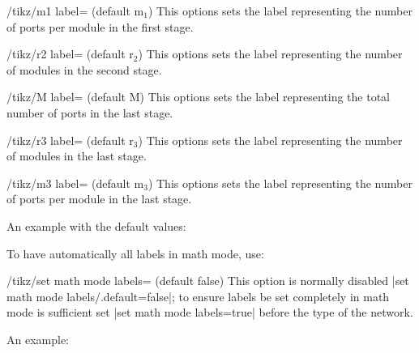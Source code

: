 \documentclass{ltxdoc} %
\begin{document}
\begin{key}{/tikz/m1 label= (default m$_1$)}
    This options sets the label representing the number of ports per module in the first stage.
\end{key}

\begin{key}{/tikz/r2 label= (default r$_2$)}
    This options sets the label representing the number of modules in the second stage.
\end{key}

\begin{key}{/tikz/M label= (default M)}
    This options sets the label representing the total number of ports in the last stage.
\end{key}

\begin{key}{/tikz/r3 label= (default r$_3$)}
    This options sets the label representing the number of modules in the last stage.
\end{key}

\begin{key}{/tikz/m3 label= (default m$_3$)}
    This options sets the label representing the number of ports per module in the last stage.
\end{key}

An example with the default values:

\begin{codeexample}[]
\end{codeexample}

To have automatically all labels in math mode, use:
\begin{key}{/tikz/set math mode labels= (default false)}
	This option is normally disabled |set math mode labels/.default=false|; to ensure labels be set completely in math mode is sufficient set |set math mode labels=true| before the type of the network.
\end{key}

An example:
\begin{codeexample}[]
\end{codeexample}
\end{document}
